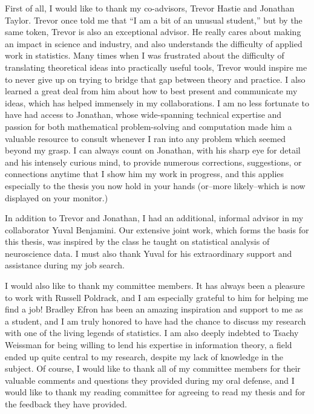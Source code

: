 \documentclass[12pt]{report}
\begin{document}
First of all, I would like to thank my co-advisors, Trevor Hastie and
Jonathan Taylor.  Trevor once told me that ``I am a bit of an unusual
student,'' but by the same token, Trevor is also an exceptional
advisor.  He really cares about making an impact in science and
industry, and also understands the difficulty of applied work in
statistics.  Many times when I was frustrated about the difficulty of
translating theoretical ideas into practically useful tools, Trevor
would inspire me to never give up on trying to bridge that gap between
theory and practice.  I also learned a great deal from him about how
to best present and communicate my ideas, which has helped immensely
in my collaborations.  I am no less fortunate to have had access to
Jonathan, whose wide-spanning technical expertise and passion for both
mathematical problem-solving and computation made him a valuable
resource to consult whenever I ran into any problem which seemed
beyond my grasp.  I can always count on Jonathan, with his sharp eye
for detail and his intensely curious mind, to provide numerous
corrections, suggestions, or connections anytime that I show him my
work in progress, and this applies especially to the thesis you now
hold in your hands (or--more likely--which is now displayed on your
monitor.)

In addition to Trevor and Jonathan, I had an additional, informal
advisor in my collaborator Yuval Benjamini.  Our extensive joint work,
which forms the basis for this thesis, was inspired by the class he
taught on statistical analysis of neuroscience data.  I must also
thank Yuval for his extraordinary support and assistance during my job
search.

I would also like to thank my committee members.  It has always been a
pleasure to work with Russell Poldrack, and I am especially grateful
to him for helping me find a job!  Bradley Efron has been an amazing
inspiration and support to me as a student, and I am truly honored to
have had the chance to discuss my research with one of the living
legends of statistics.  I am also deeply indebted to Tsachy Weissman
for being willing to lend his expertise in information theory, a field
ended up quite central to my research, despite my lack of knowledge in
the subject.  Of course, I would like to thank all of my committee
members for their valuable comments and questions they provided during
my oral defense, and I would like to thank my reading committee for
agreeing to read my thesis and for the feedback they have provided.
\end{document}
